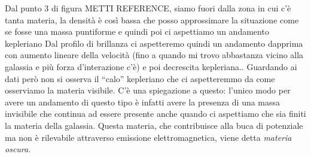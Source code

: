 Dal punto 3 di figura METTI REFERENCE, siamo fuori dalla zona in cui c’è tanta materia, la densità è così bassa che posso approssimare la situazione come se fosse una massa puntiforme e quindi poi ci aspettiamo un andamento kepleriano Dal profilo di brillanza ci aspetteremo quindi un andamento dapprima con aumento lineare della velocità (fino a quando mi trovo abbastanza vicino alla galassia e più forza d'interazione c'è) e poi decrescita kepleriana.. Guardando ai dati però non si osserva il “calo” kepleriano che ci aspetteremmo da come osserviamo la materia visibile. C'è una spiegazione a questo: l'unico modo per avere un andamento di questo tipo è infatti avere la presenza di una massa invisibile che continua ad essere presente anche quando ci aspettiamo che sia finiti la materia della galassia. Questa materia, che contribuisce alla buca di potenziale ma non è rilevabile attraverso emissione elettromagnetica, viene detta \emph{materia oscura}.